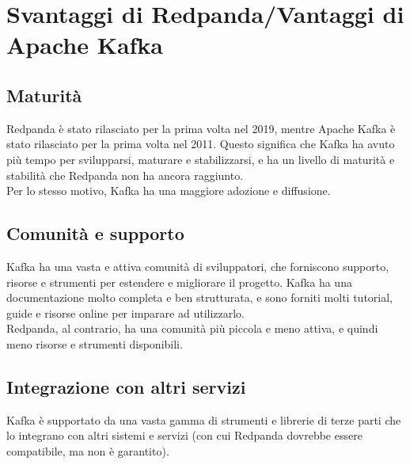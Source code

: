 \section{Svantaggi di Redpanda/Vantaggi di Apache Kafka}
\subsection{Maturità}
Redpanda è stato rilasciato per la prima volta nel 2019, mentre Apache Kafka è stato rilasciato
per la prima volta nel 2011. Questo significa che Kafka ha avuto più tempo per svilupparsi,
maturare e stabilizzarsi, e ha un livello di maturità e stabilità che Redpanda non
ha ancora raggiunto.\\
Per lo stesso motivo, Kafka ha una maggiore adozione e diffusione.

\subsection{Comunità e supporto}
Kafka ha una vasta e attiva comunità di sviluppatori, che forniscono supporto, risorse e strumenti per estendere e migliorare il progetto.
Kafka ha una documentazione molto completa e ben strutturata, e sono forniti molti tutorial, guide e risorse online per imparare ad utilizzarlo.\\
Redpanda, al contrario, ha una comunità più piccola e meno attiva, e quindi meno risorse e strumenti disponibili.\\

\subsection{Integrazione con altri servizi}
Kafka è supportato da una vasta gamma di strumenti e librerie di terze parti che lo integrano con altri sistemi e servizi
(con cui Redpanda dovrebbe essere compatibile, ma non è garantito).


